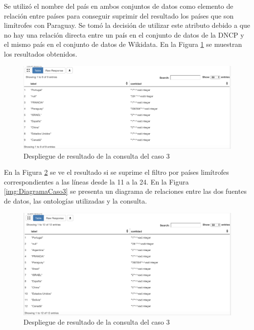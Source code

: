 Se utilizó el nombre del país en ambos conjuntos de datos como elemento de relación entre países para conseguir suprimir del resultado los países que son limítrofes con Paraguay. Se tomó la decisión de utilizar este atributo debido a que no hay una relación directa entre un país en el conjunto de datos de la DNCP y el mismo país en el conjunto de datos de Wikidata. En la Figura \ref{img:caso3Resultado1} se muestran los resultados obtenidos.


\begin{figure}[ht!]
    \centering
    \includegraphics[width=150mm]{figuras/caso3Resultado1.png}
    \caption{Despliegue de resultado de la consulta del caso 3}
    \label{img:caso3Resultado1}
 \end{figure}


En la Figura \ref{img:caso3Resultado2} se ve el resultado si se suprime el filtro por países limítrofes correspondientes a las líneas desde la 11 a la 24. En la Figura \ref{img:DiagramaCaso3} se presenta un diagrama de relaciones entre las dos fuentes de datos, las ontologías utilizadas y la consulta.


 \begin{figure}[ht!]
    \centering
    \includegraphics[width=150mm]{figuras/caso3Resultado2.png}
    \caption{Despliegue de resultado de la consulta del caso 3}
    \label{img:caso3Resultado2}
 \end{figure}


